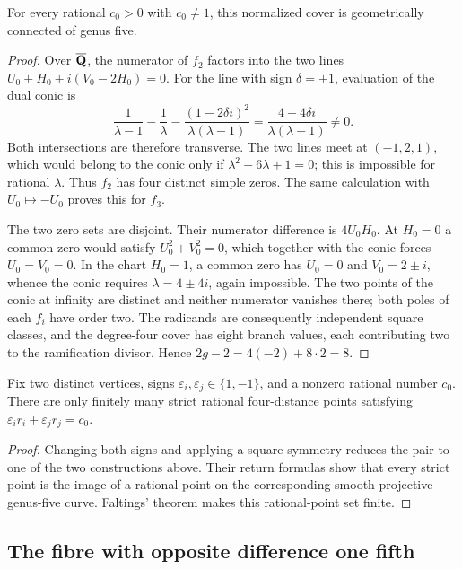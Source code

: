 \begin{proposition}\label{prop:ell-adjacent-genus}
For every rational $c_0>0$ with $c_0\ne1$, this normalized cover
is geometrically connected of genus five.
\end{proposition}
\begin{proof}
Over $\overline{\mathbf Q}$, the numerator of $f_2$ factors into the two lines
$U_0+H_0\pm i(V_0-2H_0)=0$.
For the line with sign $\delta=\pm1$, evaluation of the dual conic is
\[
 \frac{1}{\lambda-1}-\frac1\lambda
 -\frac{(1-2\delta i)^2}{\lambda(\lambda-1)}
 =\frac{4+4\delta i}{\lambda(\lambda-1)}\ne0.
\]
Both intersections are therefore transverse.  The two lines meet at
$(-1,2,1)$, which would belong to the conic only if
$\lambda^2-6\lambda+1=0$; this is impossible for rational $\lambda$.
Thus $f_2$ has four distinct simple zeros.  The same calculation
with $U_0\mapsto-U_0$ proves this for $f_3$.

The two zero sets are disjoint.  Their numerator difference is
$4U_0H_0$.  At $H_0=0$ a common zero would satisfy
$U_0^2+V_0^2=0$, which together with the conic forces
$U_0=V_0=0$.  In the chart $H_0=1$, a common zero has
$U_0=0$ and $V_0=2\pm i$, whence the conic requires
$\lambda=4\pm4i$, again impossible.
The two points of the conic at infinity are distinct and neither
numerator vanishes there; both poles of each $f_i$ have order two.
The radicands are consequently independent square classes, and
the degree-four cover has eight branch values, each contributing
two to the ramification divisor.  Hence
$2g-2=4(-2)+8\cdot2=8$.
\end{proof}

\begin{theorem}\label{thm:ell-fixed-pair-finite}
Fix two distinct vertices, signs $\varepsilon_i,\varepsilon_j\in\{1,-1\}$,
and a nonzero rational number $c_0$.
There are only finitely many strict rational four-distance points satisfying
$\varepsilon_i r_i+\varepsilon_j r_j=c_0$.
\end{theorem}
\begin{proof}
Changing both signs and applying a square symmetry reduces the pair
to one of the two constructions above.  Their return formulas show
that every strict point is the image of a rational point on the
corresponding smooth projective genus-five curve.  Faltings'
theorem \cite{faltings1983} makes this rational-point set finite.
\end{proof}

\subsection{The fibre with opposite difference one fifth}
\label{subsec:ell-one-fifth}

